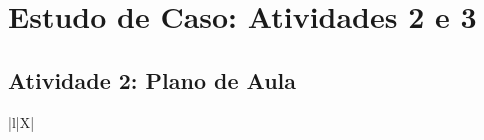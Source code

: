 \chapter{Estudo de Caso: Atividades 2 e 3} \label{Chap:AppendixLesson2}

\section{Atividade 2: Plano de Aula}\label{section:atividade2_planoaula}

\begin{xltabular}{\textwidth}{|l|X|}
	\hline
	\endfirsthead
	
	\hline {} \\ \hline
	\endhead
	
	\hline {} \\ \hline
	\endfoot
	
	\hline
	\endlastfoot
	

\end{xltabular}
